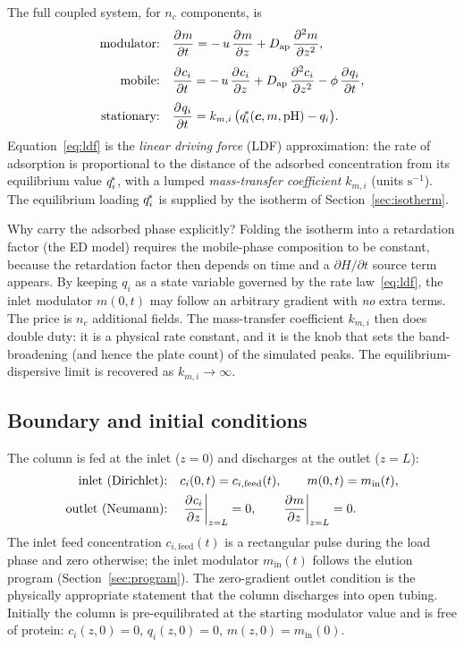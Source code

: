 The full coupled system, for $n_c$ components, is
%
\begin{align}
\text{modulator:}\quad
&\pdv{m}{t} = -\,u\,\pdv{m}{z} + D_{\mathrm{ap}}\,\pdv[2]{m}{z},
\label{eq:mod}\\[0.4em]
\text{mobile:}\quad
&\pdv{c_i}{t} = -\,u\,\pdv{c_i}{z} + D_{\mathrm{ap}}\,\pdv[2]{c_i}{z}
  - \phi\,\pdv{q_i}{t},
\label{eq:mobile}\\[0.4em]
\text{stationary:}\quad
&\pdv{q_i}{t} = k_{m,i}\,\bigl(\qstar_i(\bm c, m, \mathrm{pH}) - q_i\bigr).
\label{eq:ldf}
\end{align}
%
Equation~\eqref{eq:ldf} is the \emph{linear driving force} (LDF) approximation:
the rate of adsorption is proportional to the distance of the adsorbed
concentration from its equilibrium value $\qstar_i$, with a lumped
\emph{mass-transfer coefficient} $k_{m,i}$ (units $\mathrm{s^{-1}}$). The
equilibrium loading $\qstar_i$ is supplied by the isotherm of
Section~\ref{sec:isotherm}.

\begin{keybox}{Why carry the adsorbed phase explicitly?}
Folding the isotherm into a retardation factor (the ED model) requires the
mobile-phase composition to be constant, because the retardation factor then
depends on time and a $\partial H/\partial t$ source term appears. By keeping
$q_i$ as a state variable governed by the rate law~\eqref{eq:ldf}, the inlet
modulator $m(0,t)$ may follow an arbitrary gradient with \emph{no} extra terms.
The price is $n_c$ additional fields. The mass-transfer coefficient $k_{m,i}$
then does double duty: it is a physical rate constant, and it is the knob that
sets the band-broadening (and hence the plate count) of the simulated peaks. The
equilibrium-dispersive limit is recovered as $k_{m,i}\to\infty$.
\end{keybox}

\subsection{Boundary and initial conditions}

The column is fed at the inlet ($z=0$) and discharges at the outlet ($z=L$):
%
\begin{align}
\text{inlet (Dirichlet):}\quad & c_i(0,t) = c_{i,\mathrm{feed}}(t), \qquad
  m(0,t) = m_{\mathrm{in}}(t), \\
\text{outlet (Neumann):}\quad & \left.\pdv{c_i}{z}\right|_{z=L} = 0, \qquad
  \left.\pdv{m}{z}\right|_{z=L} = 0.
\end{align}
%
The inlet feed concentration $c_{i,\mathrm{feed}}(t)$ is a rectangular pulse
during the load phase and zero otherwise; the inlet modulator $m_{\mathrm{in}}(t)$
follows the elution program (Section~\ref{sec:program}). The zero-gradient
outlet condition is the physically appropriate statement that the column
discharges into open tubing. Initially the column is pre-equilibrated at the
starting modulator value and is free of protein:
$c_i(z,0)=0$, $q_i(z,0)=0$, $m(z,0)=m_{\mathrm{in}}(0)$.

